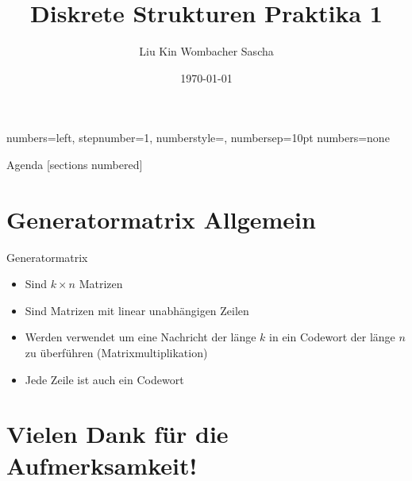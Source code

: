 \documentclass{beamer}
\title{Diskrete Strukturen \newline Praktika 1}
\date{\today}
\author{Liu Kin \newline Wombacher Sascha}
\begin{document}
  {numbers=left, stepnumber=1, numberstyle=\tiny, numbersep=10pt}
  {numbers=none}


  \maketitle
  \begin{frame}{Agenda}
    [sections numbered]
    \tableofcontents[hideallsubsections]
  \end{frame}
  
  
  \section{Generatormatrix Allgemein}
    \begin{frame}{Generatormatrix}
	\begin{itemize}
		\item Sind $k \times n$ Matrizen
		\item Sind Matrizen mit linear unabhängigen Zeilen
		\item Werden verwendet um eine Nachricht der länge $k$ in ein Codewort der länge $n$ zu überführen (Matrixmultiplikation)
		\item Jede Zeile ist auch ein Codewort
  	\end{itemize}
    \end{frame}  

\section*{Vielen Dank für die Aufmerksamkeit!}
  
\end{document}

